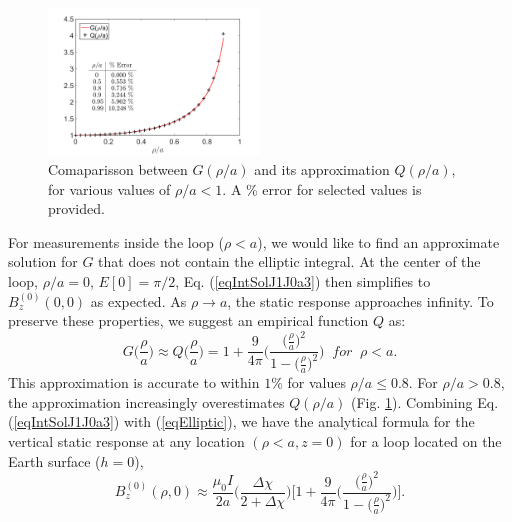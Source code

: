 \documentclass[onecolumn]{IEEEtran} %
\begin{document}
\begin{figure}[!t]
\centering
\includegraphics[width=0.50\textwidth]{DCowanVRM2017/imagesColor/figElliptic.png}
\caption{Comaparisson between $G(\rho /a)$  and its approximation $Q(\rho /a)$, for various values of $\rho /a < 1$. A
\% error for selected values is provided.}
\label{figElliptic}
\end{figure}
%

For measurements inside the loop ($\rho <a$), we would like to find an approximate solution for $G$ that does not contain the elliptic integral. At the center of the loop, $\rho /a =0$, $E[0]= \pi /2$, Eq. (\ref{eqIntSolJ1J0a3}) then simplifies to $B_z^{(0)} (0,0)$ as expected. As $\rho \rightarrow a$, the static response approaches infinity. To preserve these properties, we suggest an empirical function $Q$ as:
\begin{equation}
\label{eqElliptic} G \Big ( \frac{\rho}{a} \Big ) \approx Q \Big (
\frac{\rho}{a} \Big ) = 1 + \frac{9}{4\pi} \Bigg ( \frac{\big(
\frac{\rho}{a} \big )^2}{1- \big( \frac{\rho}{a} \big )^2} \Bigg )
\; \; for \; \; \rho < a.
\end{equation}
This approximation  is accurate to within $1\% $ for values $\rho / a \leq 0.8$. For $\rho /a > 0.8$, the approximation increasingly overestimates $Q (\rho /a)$ (Fig. \ref{figElliptic}). Combining Eq. (\ref{eqIntSolJ1J0a3}) with (\ref{eqElliptic}), we have the analytical formula for the vertical static response at any location $(\rho < a,z=0)$ for a loop located on the Earth surface ($h=0$),
\begin{equation}
B^{(0)}_z(\rho,0) \approx \frac{\mu_0 I}{2a}  \Bigg ( \frac{\Delta
\chi}{2+\Delta \chi} \Bigg ) \Bigg [ 1 + \frac{9}{4\pi} \Bigg (
\frac{\big( \frac{\rho}{a} \big )^2}{1- \big( \frac{\rho}{a} \big
)^2} \Bigg ) \Bigg ]. \label{eqStaticLoopBz}
\end{equation}
\\\\
\end{document}
